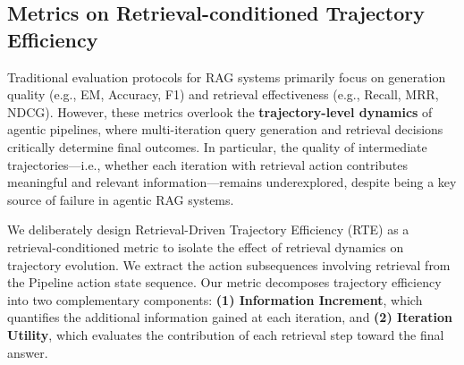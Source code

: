 \subsection{Metrics on Retrieval-conditioned Trajectory Efficiency}
Traditional evaluation protocols for RAG systems primarily focus on generation quality (e.g., EM, Accuracy, F1) and retrieval effectiveness (e.g., Recall, MRR, NDCG). However, these metrics overlook the \textbf{trajectory-level dynamics} of agentic pipelines, where multi-iteration query generation and retrieval decisions critically determine final outcomes. In particular, the quality of intermediate trajectories—i.e., whether each iteration with retrieval action contributes meaningful and relevant information—remains underexplored, despite being a key source of failure in agentic RAG systems.

We deliberately design Retrieval-Driven Trajectory Efficiency (RTE) as a retrieval-conditioned metric to isolate the effect of retrieval dynamics on trajectory evolution. We extract the action subsequences involving retrieval from the Pipeline action state sequence. Our metric decomposes trajectory efficiency into two complementary components: 
\textbf{(1) Information Increment}, which quantifies the additional information gained at each iteration, and 
\textbf{(2) Iteration Utility}, which evaluates the contribution of each retrieval step toward the final answer.

